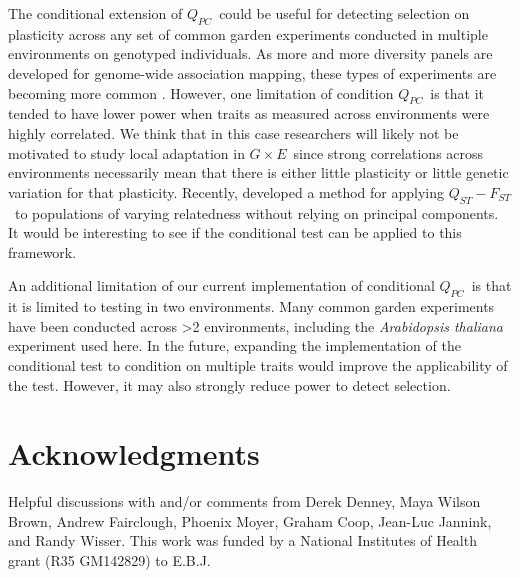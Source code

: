 \documentclass[11pt,letterpaper]{article}
\newcommand{\gxe}{$G \times E$}
\newcommand{\qpc}{$Q_{PC}$}
\newcommand{\qf}{$Q_{ST}-F_{ST}$}
\begin{document}
The conditional extension of \qpc\ could be useful for detecting selection on plasticity across any set of common garden experiments conducted in multiple environments on genotyped individuals.
As more and more diversity panels are developed for genome-wide association mapping, these types of experiments are becoming more common \citep{mead2026variation, MacQueen_2025, fournier2011map}.
However, one limitation of condition \qpc\ is that it tended to have lower power when traits as measured across environments were highly correlated.
We think that in this case researchers will likely not be motivated to study local adaptation in \gxe\ since strong correlations across environments necessarily mean that there is either little plasticity or little genetic variation for that plasticity.
Recently, \cite{do2025method} developed a method for applying \qf\ to populations of varying relatedness without relying on principal components. 
It would be interesting to see if the conditional test can be applied to this framework.

An additional limitation of our current implementation of conditional \qpc\ is that it is limited to testing in two environments.
Many common garden experiments have been conducted across >2 environments, including the \textit{Arabidopsis thaliana} experiment used here.
In the future, expanding the implementation of the conditional test to condition on multiple traits would improve the applicability of the test.
However, it may also strongly reduce power to detect selection.



\section*{Acknowledgments}
Helpful discussions with and/or comments from Derek Denney, Maya Wilson Brown, Andrew Fairclough, Phoenix Moyer, Graham Coop, Jean-Luc Jannink, and Randy Wisser. This work was funded by a National Institutes of Health grant (R35 GM142829) to E.B.J.
\end{document}
